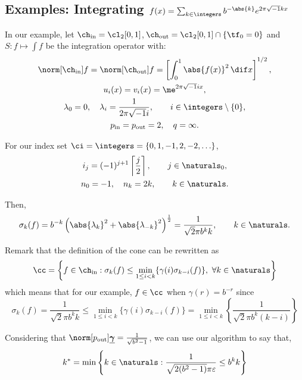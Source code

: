 \documentclass[final]{elsarticle}
\newcommand{\chin}{\ch_{\text{\rm{in}}}}
\newcommand{\chout}{\ch_{\text{\rm{out}}}}
\newcommand{\pin}{p_{\text{\rm{in}}}}
\newcommand{\pout}{p_{\text{\rm{out}}}}
\newcommand{\bgamma}{\underline{\boldsymbol\gamma}}
\theoremstyle{definition}
\theoremstyle{remark}
\begin{document}
\subsection{Examples: Integrating $f(x)=\sum_{k\in\integers}b^{-\abs{k}}e^{2\pi\sqrt{-1}kx}$}

In our example, let $\chin=\cl_2[0,1]$,$\,\chout=\cl_2[0,1]\cap\{\tf_0=0\}$ and $S: f \mapsto \int f$ be the integration operator with:
\begin{gather*}
\norm[\chin]{f} = \norm[\chout]{f} = \left[\int_0^1 \abs{f(x)}^2 \, \dif x \right]^{1/2}, \\
u_{i}(x) = v_i(x) = \me^{2 \pi \sqrt{-1} i x},\\
\lambda_0=0, \quad \lambda_i=\frac{1}{2\pi\sqrt{-1}i}, \qquad i \in \integers\setminus\{0\},\\
\pin=\pout=2,\quad q=\infty.
\end{gather*}

For our index set $\ci=\integers=\{0,1,-1,2,-2,\ldots\}$,
\begin{gather*}
i_j=(-1)^{j+1}\left\lceil\frac{j}{2}\right\rceil,\qquad j\in\naturals_0,\\
n_0=-1,\quad n_k=2k, \qquad k\in\naturals.
\end{gather*}

Then,
\begin{equation*} \sigma_k(f)=b^{-k}\left(\abs{\lambda_{k}}^2+\abs{\lambda_{-k}}^2\right)^{\frac{1}{2}}=\frac{1}{\sqrt{2}\pi b^kk}, \qquad k \in\naturals.
\end{equation*}

Remark that the definition of the cone can be rewritten as
\begin{equation}
\cc = \left\{ f \in \chin : \sigma_k(f) \le \min_{1 \le i < k}\{\gamma(i)\sigma_{k-i}(f)\}, \ \forall k \in \naturals \right\}
\end{equation}
which means that for our example, $f\in\cc$ when $\gamma(r)=b^{-r}$ since
\begin{equation*}
\sigma_k(f)=\frac{1}{\sqrt{2}\pi b^kk} \le \min_{1 \le i <k}\{\gamma(i)\sigma_{k-i}(f)\}=\min_{1 \le i <k}\left\{\frac{1}{\sqrt{2}\pi b^k(k-i)}\right\}
\end{equation*}

Considering that $\norm[\pout]{\bgamma}=\frac{1}{\sqrt{b^2-1}}$, we can use our algorithm to say that,
\begin{equation*}
k^*=\min\left\{k\in\naturals:\frac{1}{\sqrt{2(b^2-1)}\pi\varepsilon} \le b^kk \right\}
\end{equation*}
\end{document}
